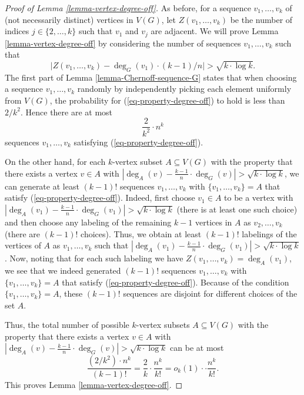\documentclass[11pt]{article}
\theoremstyle{definition}
\numberwithin{equation}{section}
\begin{document}
\begin{proof}[Proof of Lemma \ref{lemma-vertex-degree-off}]As before, for a sequence $v_1,\dots, v_k$ of (not necessarily distinct) vertices in $V(G)$, let $Z(v_1,\dots,v_k)$ be the number of indices $j\in \lbrace 2,\dots,k\rbrace$ such that $v_1$ and $v_j$ are adjacent. We will prove Lemma \ref{lemma-vertex-degree-off} by considering the number of sequences $v_1,\dots, v_k$ such that
\begin{equation}\label{eq-property-degree-off}
\vert Z(v_1,\dots,v_k)-\deg_G(v_1)\cdot (k-1)/n\vert> \sqrt{k\cdot \log k}.
\end{equation}
The first part of Lemma \ref{lemma-Chernoff-sequence-G} states that when choosing a sequence $v_1,\dots,v_k$ randomly by independently picking each element uniformly from $V(G)$, the probability for (\ref{eq-property-degree-off}) to hold is less than $2/k^2$. Hence there are at most
\[\frac{2}{k^2}\cdot n^k\]
sequences $v_1,\dots, v_k$ satisfying (\ref{eq-property-degree-off}).

On the other hand, for each $k$-vertex subset $A\subseteq V(G)$ with the property that there exists a vertex $v\in A$ with $\left\vert\deg_A(v)-\frac{k-1}{n}\cdot \deg_G(v)\right\vert>\sqrt{k\cdot \log k}$, we can generate at least $(k-1)!$ sequences $v_1,\dots, v_k$ with $\lbrace v_1,\dots,v_k\rbrace=A$ that satisfy (\ref{eq-property-degree-off}). Indeed, first choose $v_1\in A$ to be a vertex with $\left\vert\deg_A(v_1)-\frac{k-1}{n}\cdot \deg_G(v_1)\right\vert>\sqrt{k\cdot \log k}$ (there is at least one such choice) and then choose any labeling of the remaining $k-1$ vertices in $A$ as $v_2, \dots,v_k$ (there are $(k-1)!$ choices). Thus, we obtain at least $(k-1)!$ labelings of the vertices of $A$ as $v_1,\dots, v_k$ such that $\left\vert\deg_A(v_1)-\frac{k-1}{n}\cdot \deg_G(v_1)\right\vert>\sqrt{k\cdot \log k}$. Now, noting that for each such labeling we have $Z(v_1,\dots,v_k)=\deg_A(v_1)$, we see that we indeed generated $(k-1)!$ sequences $v_1,\dots, v_k$ with $\lbrace v_1,\dots,v_k\rbrace=A$ that satisfy (\ref{eq-property-degree-off}). Because of the condition $\lbrace v_1,\dots,v_k\rbrace=A$, these $(k-1)! $ sequences are disjoint for different choices of the set $A$.

Thus, the total number of possible $k$-vertex subsets $A\subseteq V(G)$ with the property that there exists a vertex $v\in A$ with $\left\vert\deg_A(v)-\frac{k-1}{n}\cdot \deg_G(v)\right\vert>\sqrt{k\cdot \log k}$ can be at most
\[\frac{(2/k^2)\cdot n^k}{(k-1)!}=\frac{2}{k}\cdot \frac{n^k}{k!}=o_k(1)\cdot \cdot \frac{n^k}{k!}.\]
This proves Lemma \ref{lemma-vertex-degree-off}.
\end{proof}
\end{document}
